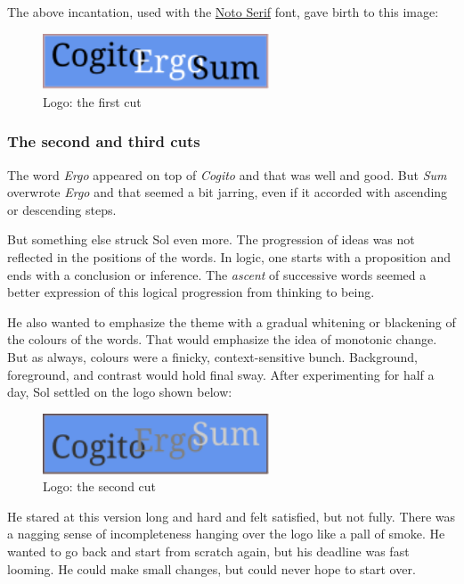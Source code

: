 \documentclass[
  a4paper,
]{article}
\begin{document}
The above incantation, used with the
\href{https://fonts.google.com/specimen/Noto+Serif}{Noto Serif} font,
gave birth to this image:

\begin{figure}
\centering
\includegraphics[width=0.6\textwidth,height=\textheight]{images/firstcut.svg}
\caption{Logo: the first cut}
\end{figure}

\hypertarget{the-second-and-third-cuts}{%
\subsubsection{The second and third
cuts}\label{the-second-and-third-cuts}}

The word \emph{Ergo} appeared on top of \emph{Cogito} and that was well
and good. But \emph{Sum} overwrote \emph{Ergo} and that seemed a bit
jarring, even if it accorded with ascending or descending steps.

But something else struck Sol even more. The progression of ideas was
not reflected in the positions of the words. In logic, one starts with a
proposition and ends with a conclusion or inference. The \emph{ascent}
of successive words seemed a better expression of this logical
progression from thinking to being.

He also wanted to emphasize the theme with a gradual whitening or
blackening of the colours of the words. That would emphasize the idea of
monotonic change. But as always, colours were a finicky,
context-sensitive bunch. Background, foreground, and contrast would hold
final sway. After experimenting for half a day, Sol settled on the logo
shown below:

\begin{figure}
\centering
\includegraphics[width=0.6\textwidth,height=\textheight]{images/secondcut.svg}
\caption{Logo: the second cut}
\end{figure}

He stared at this version long and hard and felt satisfied, but not
fully. There was a nagging sense of incompleteness hanging over the logo
like a pall of smoke. He wanted to go back and start from scratch again,
but his deadline was fast looming. He could make small changes, but
could never hope to start over.
\end{document}
